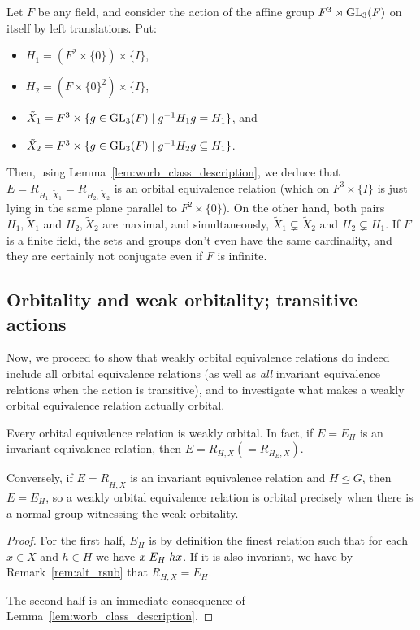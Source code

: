 	\begin{ex}
		Let $F$ be any field, and consider the action of the affine group $F^3\rtimes \operatorname{{GL}}_3(F)$ on itself by left translations. Put:
		\begin{itemize}
			\item
			$H_1=(F^2\times \{0\})\times \{I\}$,
			\item
			$H_2=(F\times \{0\}^2)\times\{I\}$,
			\item
			$\tilde X_1=F^3\times \{g\in \operatorname{{GL}}_3(F)\mid g^{-1}H_1g=H_1 \}$, and
			\item
			$\tilde X_2=F^3\times \{g\in \operatorname{{GL}}_3(F)\mid g^{-1}H_2g\subseteq H_1\}$.
		\end{itemize}
		Then, using Lemma~\ref{lem:worb_class_description}, we deduce that $E=R_{H_1,\tilde X_1}=R_{H_2,\tilde X_2}$ is an orbital equivalence relation (which on $F^3\times \{I\}$ is just lying in the same plane parallel to $F^2\times \{0\}$). On the other hand, both pairs $H_1, \tilde X_1$ and $H_2,\tilde X_2$ are maximal, and simultaneously, $\tilde X_1\subsetneq \tilde X_2$ and $H_2\subsetneq H_1$. If $F$ is a finite field, the sets and groups don't even have the same cardinality, and they are certainly not conjugate even if $F$ is infinite.\xqed{\lozenge}
	\end{ex}
	
	\subsection*{Orbitality and weak orbitality; transitive actions}
	\label{ssec:orb+trans_as_worb}
	Now, we proceed to show that weakly orbital equivalence relations do indeed include all orbital equivalence relations (as well as \emph{all} invariant equivalence relations when the action is transitive), and to investigate what makes a weakly orbital equivalence relation actually orbital.
	\begin{prop}
		\label{prop:orb_is_worb}
		
		
		Every orbital equivalence relation is weakly orbital. In fact, if $E=E_H$ is an invariant equivalence relation, then $E=R_{H,X}(=R_{H_E,X})$.
		
		Conversely, if $E=R_{H,\tilde X}$ is an invariant equivalence relation and $H\unlhd G$, then $E=E_H$, so a weakly orbital equivalence relation is orbital precisely when there is a normal group witnessing the weak orbitality.
	\end{prop}
	\begin{proof}
		For the first half, $E_H$ is by definition the finest relation such that for each $x\in X$ and $h\in H$ we have $x\mathrel{E}_H hx$. If it is also invariant, we have by Remark~\ref{rem:alt_rsub} that $R_{H,X}=E_H$.
		
		The second half is an immediate consequence of Lemma~\ref{lem:worb_class_description}.
	\end{proof}
	
